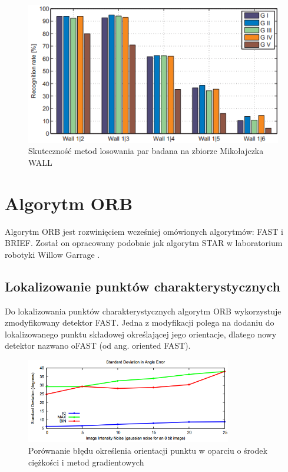 \begin{figure}
\centering
\includegraphics[scale=0.8]{pict/02/brief/G_comp.png}
\caption{Skuteczność metod losowania par badana na zbiorze Mikołajczka WALL}
\label{fig:brief_G_comp}
\end{figure}

\FloatBarrier
\newpage
\section{Algorytm ORB}
Algorytm ORB jest rozwinięciem wcześniej omówionych algorytmów: FAST i BRIEF. Został on opracowany podobnie jak algorytm STAR w laboratorium robotyki Willow Garrage \cite{ORB11}. 

\subsection{Lokalizowanie punktów charakterystycznych}
Do lokalizowania punktów charakterystycznych algorytm ORB wykorzystuje zmodyfikowany detektor FAST. Jedna z modyfikacji polega na dodaniu do lokalizowanego punktu składowej określającej jego orientacje, dlatego nowy detektor nazwano oFAST (od ang. oriented FAST).


\begin{figure}
\centering
\includegraphics[width=0.8\textwidth]{pict/02/orb/orb_wykres_2.png}
\caption{Porównanie błędu określenia orientacji punktu w oparciu o środek ciężkości i metod gradientowych}
\label{fig:orb_wykres_2}
\end{figure}






